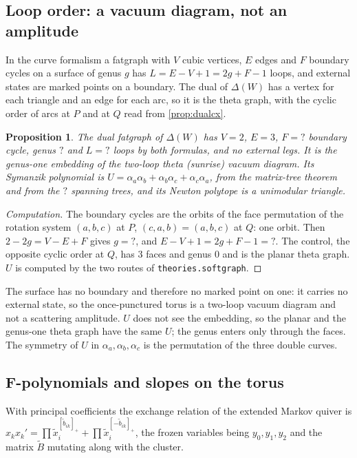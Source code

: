 \documentclass[11pt,a4paper]{article}
\newcommand{\SSSfLoops}{?}\newcommand{\SSSfGenus}{?}\newcommand{\SSSfFaces}{?}
\newcommand{\SSSfTrees}{?}\newcommand{\SSSfPExchange}{?}\newcommand{\SSSfCrossTen}{?}
\theoremstyle{plain}
\newtheorem{proposition}{Proposition}
\theoremstyle{definition}
\begin{document}
\subsection{Loop order: a vacuum diagram, not an amplitude}
\label{sec:surf-loops}

In the curve formalism a fatgraph with $V$ cubic vertices, $E$ edges and $F$ boundary cycles on a surface of genus $g$ has $L=E-V+1=2g+F-1$ loops, and
external states are marked points on a boundary. The dual of $\Delta(W)$ has a vertex for each triangle and an edge for each arc, so it is the theta graph, with
the cyclic order of arcs at $P$ and at $Q$ read from \cref{prop:dualcx}.

\begin{proposition}
\label{prop:surf-loops}
The dual fatgraph of $\Delta(W)$ has $V=2$, $E=3$, $F=\SSSfFaces$ boundary cycle, genus $\SSSfGenus$ and $L=\SSSfLoops$ loops by both formulas, and no external legs. It is the
genus-one embedding of the two-loop theta (sunrise) vacuum diagram. Its Symanzik polynomial is $U=\alpha_a\alpha_b+\alpha_b\alpha_c+\alpha_c\alpha_a$, from the matrix-tree theorem and from the
$\SSSfTrees$ spanning trees, and its Newton polytope is a unimodular triangle.
\end{proposition}

\begin{proof}[Computation]
The boundary cycles are the orbits of the face permutation of the rotation system $(a,b,c)$ at $P$, $(c,a,b)=(a,b,c)$ at $Q$: one orbit. Then $2-2g=V-E+F$ gives $g=\SSSfGenus$, and
$E-V+1=2g+F-1=\SSSfLoops$. The control, the opposite cyclic order at $Q$, has $3$ faces and genus $0$ and is the planar theta graph. $U$ is computed by the two routes of
\texttt{theories.softgraph}.
\end{proof}

The surface has no boundary and therefore no marked point on one: it carries no external state, so the once-punctured torus is a two-loop vacuum diagram and not a scattering
amplitude. $U$ does not see the embedding, so the planar and the genus-one theta graph have the same $U$; the genus enters only through the faces. The symmetry of $U$ in
$\alpha_a,\alpha_b,\alpha_c$ is the permutation of the three double curves.

\subsection{F-polynomials and slopes on the torus}

With principal coefficients the exchange relation of the extended Markov quiver is $x_kx_k'=\prod\tilde x_i^{[\tilde b_{ik}]_+}+\prod\tilde x_i^{[-\tilde b_{ik}]_+}$, the frozen variables being
$y_0,y_1,y_2$ and the matrix $\tilde B$ mutating along with the cluster.
\end{document}
